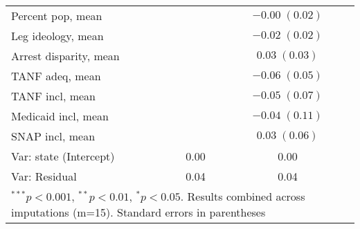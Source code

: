 \begin{table}
\begin{center}
\begin{tabular}{l c c }
Percent pop, mean          &                        & $-0.00 \; (0.02)$      \\
Leg ideology, mean         &                        & $-0.02 \; (0.02)$      \\
Arrest disparity, mean     &                        & $0.03 \; (0.03)$       \\
TANF adeq, mean            &                        & $-0.06 \; (0.05)$      \\
TANF incl, mean            &                        & $-0.05 \; (0.07)$      \\
Medicaid incl, mean        &                        & $-0.04 \; (0.11)$      \\
SNAP incl, mean            &                        & $0.03 \; (0.06)$       \\
\hline
Var: state (Intercept)     & 0.00                   & 0.00                   \\
Var: Residual              & 0.04                   & 0.04                   \\
\hline
\multicolumn{3}{l}{\scriptsize{$^{***}p<0.001$, $^{**}p<0.01$, $^*p<0.05$. Results combined across imputations (m=15). Standard errors in parentheses}}
\end{tabular}
\label{table:coefficients}
\end{center}
\end{table}
